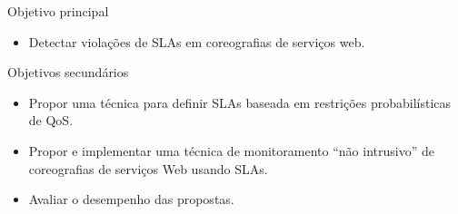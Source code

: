 \documentclass[xcolor=svgnames]{beamer}
\begin{document}
    \begin{frame}
        \begin{block}{Objetivo principal}\vspace{-.3\baselineskip}
        	\begin{itemize}
                  \item Detectar violações de SLAs em coreografias de serviços web.
            \end{itemize}
        \end{block}
        \begin{block}{Objetivos secundários}\vspace{-.3\baselineskip}
        	\begin{itemize}
		  \item	Propor uma técnica para definir SLAs baseada em restrições probabilísticas de QoS.
                  \item Propor e implementar uma técnica de monitoramento ``não intrusivo'' de coreografias
                    de serviços Web usando SLAs.
                  \item Avaliar o desempenho das propostas. %
        	\end{itemize}
        \end{block}
    \end{frame}
\end{document}
